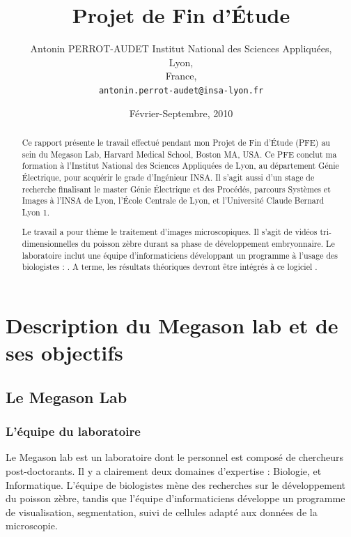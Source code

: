 




\title{Projet de Fin d'Étude} 
\author{Antonin PERROT-AUDET
  Institut National des Sciences Appliquées,\\
  Lyon,\\
  France,\\
  \texttt{antonin.perrot-audet@insa-lyon.fr}}   
\date{Février-Septembre, 2010} 
\maketitle


\begin{abstract}
  Ce rapport présente le travail effectué pendant mon Projet de Fin d'Étude (PFE) au sein du Megason Lab, Harvard Medical School, Boston MA, USA. Ce PFE conclut ma formation à l'Institut National des Sciences Appliquées de Lyon, au département Génie Électrique, pour acquérir le grade d'Ingénieur INSA. Il s'agit aussi d'un stage de recherche finalisant le master Génie Électrique et des Procédés, parcours Systèmes et Images à l'INSA de Lyon, l'École Centrale de Lyon, et l'Université Claude Bernard Lyon 1.

  Le travail a pour thème le traitement d'images microscopiques. Il s'agit de vidéos tri-dimensionnelles du poisson zèbre durant sa phase de développement embryonnaire. Le laboratoire inclut une équipe d'informaticiens développant un programme à l'usage des biologistes : {\gofigure}\cite{refGofigure2}. A terme, les résultats théoriques devront être intégrés à ce logiciel .
  
  
\tableofcontents  
  
 
\end{abstract}



\chapter{Description du Megason lab et de ses objectifs} 

\section{Le Megason Lab}

\subsection{L'équipe du laboratoire}
Le Megason lab est un laboratoire dont le personnel est composé de chercheurs post-doctorants.
Il y a clairement deux domaines d'expertise : Biologie, et Informatique.
L'équipe de biologistes mène des recherches sur le développement du poisson zèbre,
tandis que l'équipe d'informaticiens développe un programme de visualisation,
segmentation, suivi de cellules adapté aux données de la microscopie.

